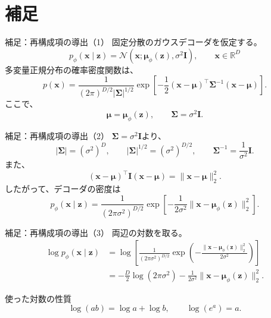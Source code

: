 \section*{補足}
\begin{frame}{補足：再構成項の導出（1）}
    固定分散のガウスデコーダを仮定する。
    \[
        p_\phi(\boldsymbol{x}\mid\boldsymbol{z})
        =
        \mathcal{N}\!\left(
        \boldsymbol{x};
        \boldsymbol{\mu}_\phi(\boldsymbol{z}),
        \sigma^2\boldsymbol{I}
        \right),
        \qquad
        \boldsymbol{x}\in\mathbb{R}^{D}
    \]
    多変量正規分布の確率密度関数は、
    \[
        p(\boldsymbol{x})
        =
        \frac{1}
        {(2\pi)^{D/2}|\boldsymbol{\Sigma}|^{1/2}}
        \exp\!\left[
        -\frac12
        (\boldsymbol{x}-\boldsymbol{\mu})^\top
        \boldsymbol{\Sigma}^{-1}
        (\boldsymbol{x}-\boldsymbol{\mu})
        \right].
    \]
    ここで、
    \[
        \boldsymbol{\mu}
        =\boldsymbol{\mu}_\phi(\boldsymbol{z}),
        \qquad
        \boldsymbol{\Sigma}=\sigma^2\boldsymbol{I}.
    \]
\end{frame}
\begin{frame}{補足：再構成項の導出（2）}
    $\boldsymbol{\Sigma}=\sigma^2\boldsymbol{I}$より、
    \[
        |\boldsymbol{\Sigma}|
        =(\sigma^2)^D,
        \qquad
        |\boldsymbol{\Sigma}|^{1/2}
        =(\sigma^2)^{D/2},
        \qquad
        \boldsymbol{\Sigma}^{-1}
        =\frac{1}{\sigma^2}\boldsymbol{I}.
    \]
    また、
    \[
        (\boldsymbol{x}-\boldsymbol{\mu})^\top
        \boldsymbol{I}
        (\boldsymbol{x}-\boldsymbol{\mu})
        =
        \|\boldsymbol{x}-\boldsymbol{\mu}\|_2^2.
    \]
    したがって、デコーダの密度は
    \[
        \boxed{
        p_\phi(\boldsymbol{x}\mid\boldsymbol{z})
        =
        \frac{1}{(2\pi\sigma^2)^{D/2}}
        \exp\!\left[
        -\frac{1}{2\sigma^2}
        \|\boldsymbol{x}
        -\boldsymbol{\mu}_\phi(\boldsymbol{z})\|_2^2
        \right]
        }.
    \]
\end{frame}
\begin{frame}{補足：再構成項の導出（3）}
    両辺の対数を取る。
    \begin{align*}
        \log p_\phi(\boldsymbol{x}\mid\boldsymbol{z})
        &=
        \log\!\left[
        \frac{1}{(2\pi\sigma^2)^{D/2}}
        \exp\!\left(
        -\frac{\|\boldsymbol{x}
        -\boldsymbol{\mu}_\phi(\boldsymbol{z})\|_2^2}
        {2\sigma^2}
        \right)
        \right]\\[6pt]
        &=
        -\frac{D}{2}\log(2\pi\sigma^2)
        -
        \frac{1}{2\sigma^2}
        \|\boldsymbol{x}
        -\boldsymbol{\mu}_\phi(\boldsymbol{z})\|_2^2.
    \end{align*}
    \begin{block}{使った対数の性質}
        \[
            \log(ab)=\log a+\log b,
            \qquad
            \log(e^a)=a.
        \]
    \end{block}
\end{frame}
